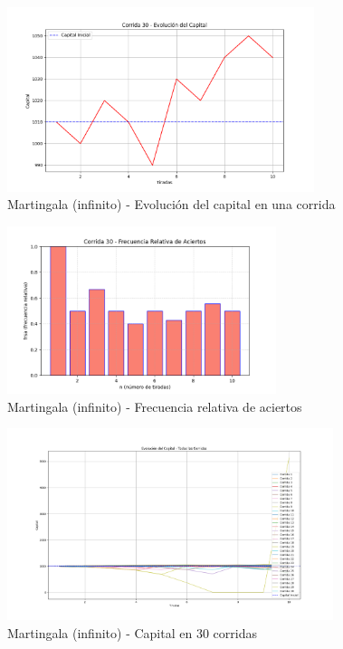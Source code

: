 \documentclass{article}
\begin{document}
\begin{figure}[H]
    \centering
    \includegraphics[width=0.8\textwidth]{./images/capital_corrida_30_m_i.png}
    \caption{Martingala (infinito) - Evolución del capital en una corrida}
\end{figure}

\begin{figure}[H]
    \centering
    \includegraphics[width=0.7\textwidth]{./images/frsa_corrida_30_m_i.png}
    \caption{Martingala (infinito) - Frecuencia relativa de aciertos}
\end{figure}

\begin{figure}[H]
    \centering
    \includegraphics[width=0.85\textwidth]{./images/capital_todas_corridas_m_i.png}
    \caption{Martingala (infinito) - Capital en 30 corridas}
\end{figure}
\end{document}
